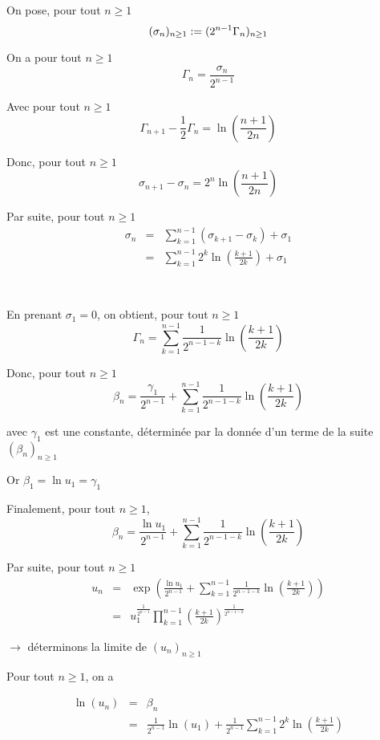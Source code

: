 On pose, pour tout $n \geq 1$
\[ (\sigma_n)_{n \geq 1} := (2^{n - 1} \Gamma_n)_{n \geq 1} \]


On a pour tout $n \geqslant 1$
\[ \Gamma_n = \frac{\sigma_n}{2^{n - 1}} \]


Avec pour tout $n \geqslant 1$
\[ \Gamma_{n + 1} - \frac{1}{2} \Gamma_n = \ln \left( \frac{n + 1}{2 n}
   \right) \]


Donc, pour tout $n \geqslant 1$
\[ \sigma_{n + 1} - \sigma_n = 2^n \ln \left( \frac{n + 1}{2 n} \right) \]


Par suite, pour tout $n \geqslant 1$
\begin{eqnarray*}
  \sigma_n & = & \sum_{k = 1}^{n - 1} (\sigma_{k + 1} - \sigma_k) + \sigma_1\\
  & = & \sum_{k = 1}^{n - 1} 2^k \ln \left( \frac{k + 1}{2 k} \right) +
  \sigma_1
\end{eqnarray*}


\

En prenant $\sigma_1 = 0$, on obtient, pour tout $n \geq 1$
\[ \Gamma_n = \sum_{k = 1}^{n - 1} \frac{1}{2^{n - 1 - k}} \ln \left( \frac{k
   + 1}{2 k} \right) \]
\text{}

Donc, pour tout $n \geq 1$
\[ \beta_n = \frac{\gamma_1}{2^{n - 1}} + \sum_{k = 1}^{n - 1} \frac{1}{2^{n
   - 1 - k}} \ln \left( \frac{k + 1}{2 k} \right) \]


avec $\gamma_1$ est une constante, d{\'e}termin{\'e}e par la donn{\'e}e d'un
terme de la suite $(\beta_n)_{n \geq 1}$

Or $\beta_1 = \ln u_1 = \gamma_1$

Finalement, pour tout $n \geq 1$,
\[ \beta_n = \frac{\ln u_1}{2^{n - 1}} + \sum_{k = 1}^{n - 1} \frac{1}{2^{n -
   1 - k}} \ln \left( \frac{k + 1}{2 k} \right) \]


Par suite, pour tout $n \geq 1$
\begin{eqnarray*}
  u_n  & = & \exp \left( \frac{\ln u_1}{2^{n - 1}} + \sum_{k = 1}^{n - 1}
  \frac{1}{2^{n - 1 - k}} \ln \left( \frac{k + 1}{2 k} \right) \right)\\
  & = & u_1^{\frac{1}{2^{n - 1}}}  \prod_{k = 1}^{n - 1} \left( \frac{k +
  1}{2 k} \right)^{\frac{1}{2^{n - 1 - k}}}
\end{eqnarray*}


$\rightarrow$ d{\'e}terminons la limite de $(u_n)_{n \geq 1}$

Pour tout $n \geqslant 1$, on a


\begin{eqnarray*}
  \ln (u_n) & = & \beta_n\\
  & = & \frac{1}{2^{n - 1}} \ln (u_1) + \frac{1}{2^{n - 1}}  \sum_{k = 1}^{n
  - 1} 2^k \ln \left( \frac{k + 1}{2 k} \right)
\end{eqnarray*}
\[ \  \]


